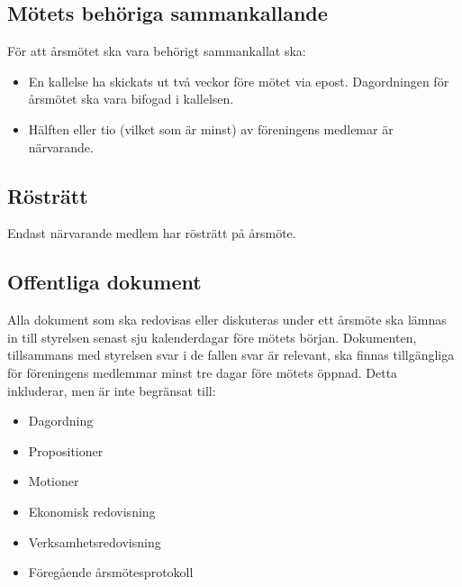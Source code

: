 \documentclass[11pt,a4paper]{article}
\begin{document}
\subsection{Mötets behöriga sammankallande}
För att årsmötet ska vara behörigt sammankallat ska:
\begin{itemize}
\item En kallelse ha skickats ut två veckor före mötet via epost.
Dagordningen för årsmötet ska vara bifogad i kallelsen.
\item Hälften eller tio (vilket som är minst) av föreningens medlemar är
närvarande.
\end{itemize}
\subsection{Rösträtt}
Endast närvarande medlem har rösträtt på årsmöte.
\subsection{Offentliga dokument}
Alla dokument som ska redovisas eller diskuteras under ett årsmöte ska
lämnas in till styrelsen senast sju kalenderdagar före mötets början.
Dokumenten, tillsammans med styrelsen svar i de fallen svar är relevant,
ska finnas tillgängliga för föreningens medlemmar minst tre dagar före
mötets öppnad. Detta inkluderar, men är inte begränsat till:
\begin{itemize}
\item Dagordning
\item Propositioner
\item Motioner
\item Ekonomisk redovisning
\item Verksamhetsredovisning
\item Föregående årsmötesprotokoll
\end{itemize}
\end{document}
